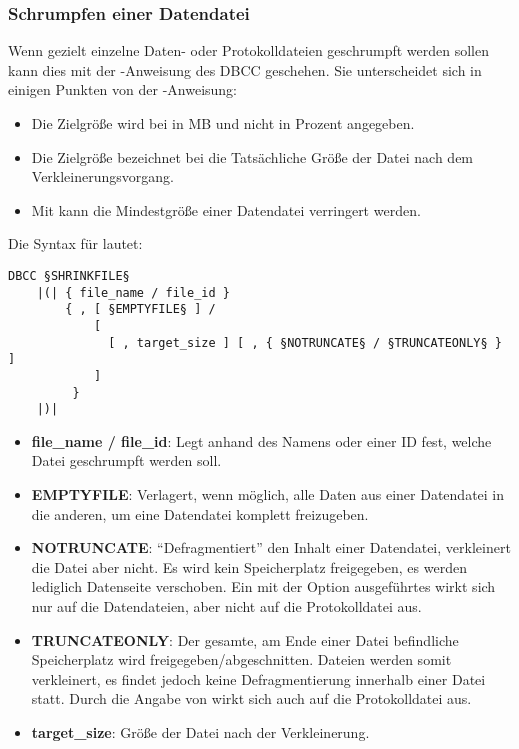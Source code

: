         \subsubsection{Schrumpfen einer Datendatei}
          Wenn gezielt einzelne Daten- oder Protokolldateien geschrumpft werden
          sollen kann dies mit der -Anweisung des DBCC
          geschehen. Sie unterscheidet sich in einigen Punkten von der
          -Anweisung:
          \begin{itemize}
              \item Die Zielgröße wird bei  in MB und
              nicht in Prozent angegeben.
              \item Die Zielgröße bezeichnet bei  die
              Tatsächliche Größe der Datei nach dem Verkleinerungsvorgang.
              \item Mit  kann die Mindestgröße einer
              Datendatei verringert werden.
          \end{itemize}
          Die Syntax für  lautet:
          \begin{lstlisting}[language=ebnf, caption={Die Syntax zu
          SHRINKFILE}, label=admin03_36]
DBCC §SHRINKFILE§
    |(| { file_name / file_id }
        { , [ §EMPTYFILE§ ] / 
            [ 
              [ , target_size ] [ , { §NOTRUNCATE§ / §TRUNCATEONLY§ } ]
            ]
         }
    |)|
          \end{lstlisting}
          \begin{itemize}
            \item \textbf{file\_name / file\_id}: Legt anhand des
            Namens oder einer ID fest, welche Datei geschrumpft werden soll.
            \item \textbf{EMPTYFILE}: Verlagert, wenn möglich, alle Daten aus
            einer Datendatei in die anderen, um eine Datendatei komplett
            freizugeben.
            \item \textbf{NOTRUNCATE}: \enquote{Defragmentiert} den
            Inhalt einer Datendatei, verkleinert die Datei aber nicht. Es wird
            kein Speicherplatz freigegeben, es werden lediglich Datenseite
            verschoben. Ein mit der Option 
            ausgeführtes  wirkt sich nur
            auf die Datendateien, aber nicht auf die Protokolldatei aus.
            \item \textbf{TRUNCATEONLY}: Der gesamte, am Ende einer
            Datei befindliche Speicherplatz wird freigegeben/abgeschnitten.
            Dateien werden somit verkleinert, es findet jedoch keine
            Defragmentierung innerhalb einer Datei statt. Durch die Angabe von
             wirkt sich  auch auf die Protokolldatei aus.
            \item \textbf{target\_size}: Größe der Datei nach der
            Verkleinerung.
          \end{itemize}
